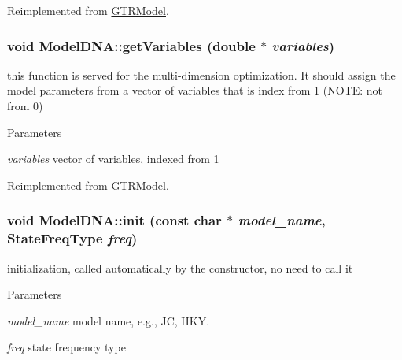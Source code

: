 Reimplemented from \hyperlink{classGTRModel_a6e2066898fbbb245596d4a97dd8ee33c}{GTRModel}.\hypertarget{classModelDNA_a4083dfee9b55936019483c5e9a4bb2f7}{
\subsubsection[{getVariables}]{\setlength{\rightskip}{0pt plus 5cm}void ModelDNA::getVariables (double $\ast$ {\em variables})}}
\label{classModelDNA_a4083dfee9b55936019483c5e9a4bb2f7}
this function is served for the multi-\/dimension optimization. It should assign the model parameters from a vector of variables that is index from 1 (NOTE: not from 0) 
\begin{DoxyParams}{Parameters}
\item[{\em variables}]vector of variables, indexed from 1 \end{DoxyParams}


Reimplemented from \hyperlink{classGTRModel_ae0d291e293dd142d41466650539a2481}{GTRModel}.\hypertarget{classModelDNA_ad7f5b56ae6499a222c01ad81e92e27a2}{
\subsubsection[{init}]{\setlength{\rightskip}{0pt plus 5cm}void ModelDNA::init (const char $\ast$ {\em model\_\-name}, \/  StateFreqType {\em freq})}}
\label{classModelDNA_ad7f5b56ae6499a222c01ad81e92e27a2}
initialization, called automatically by the constructor, no need to call it 
\begin{DoxyParams}{Parameters}
\item[{\em model\_\-name}]model name, e.g., JC, HKY. \item[{\em freq}]state frequency type \end{DoxyParams}


